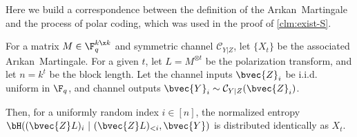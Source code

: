 \documentclass[11pt]{article}
\newcommand{\Arikan}{Ar\i kan}
\begin{document}
Here we build a correspondence between the definition of the \Arikan~Martingale and the process of polar coding, which was used in the proof of \cref{clm:exist-S}.

\begin{lemma}
	\label{lem:mart-code}
	For a matrix $M \in \F_q^{k \x k}$ and symmetric channel $\mathcal{C}_{Y | Z}$,
	let $\{X_t\}$ be the associated \Arikan~Martingale.
	For a given $t$,  let $L = M^{\otimes t}$ be the polarization transform,
	and let $n = k^t$ be the block length.
	Let the channel inputs $\bvec{Z}_i$ be i.i.d. uniform in $\F_q$,
	and channel outputs $\bvec{Y}_i \sim \mathcal{C}_{Y|Z}(\bvec{Z}_i)$.
	
	Then, for a uniformly random index $i \in [n]$,
	the normalized entropy $\bH((\bvec{Z} L)_i ~|~   (\bvec{Z} L)_{< i}, \bvec{Y})$
	is distributed identically as $X_t$.
\end{lemma}
\end{document}
